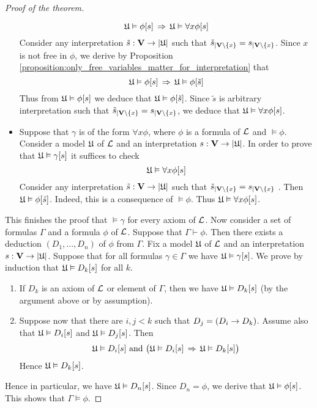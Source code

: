 \begin{proof}[Proof of the theorem]
\begin{itemize}
$${\mathfrak U} \vDash \phi[s] \,\Rightarrow\, {\mathfrak U} \vDash \forall x\phi[s]$$
Consider any interpretation $\tilde{s}:\mathbf{V} \rightarrow |{\mathfrak U}|$ such that $\tilde{s}_{\mid \mathbf{V}\setminus \{x\}} = s_{\mid \mathbf{V}\setminus \{x\}}$. Since $x$ is not free in $\phi$, we derive by Proposition \ref{proposition:only_free_variables_matter_for_interpretation} that
$${\mathfrak U} \vDash \phi[s] \,\Rightarrow\, {\mathfrak U} \vDash \phi[\tilde{s}]$$
Thus from ${\mathfrak U} \vDash \phi[s]$ we deduce that ${\mathfrak U} \vDash \phi[\tilde{s}]$. Since $\tilde{s}$ is arbitrary interpretation such that $\tilde{s}_{\mid \mathbf{V}\setminus \{x\}} = s_{\mid \mathbf{V}\setminus \{x\}}$, we deduce that ${\mathfrak U} \vDash \forall x\phi[s]$.
\item Suppose that $\gamma$ is of the form $\forall x\phi$, where $\phi$ is a formula of ${\mathcal L}$ and $\vDash \phi$. Consider a model ${\mathfrak U}$ of ${\mathcal L}$ and an interpretation $s:\mathbf{V} \rightarrow |{\mathfrak U}|$. In order to prove that ${\mathfrak U} \vDash \gamma[s]$ it suffices to check
$${\mathfrak U} \vDash \forall x\phi[s]$$
Consider any interpretation $\tilde{s}:\mathbf{V} \rightarrow |{\mathfrak U}|$ such that $\tilde{s}_{\mid \mathbf{V}\setminus \{x\}} = s_{\mid \mathbf{V}\setminus \{x\}}$ . Then ${\mathfrak U} \vDash \phi[\tilde{s}]$. Indeed, this is a consequence of $\vDash \phi$. Thus ${\mathfrak U} \vDash \forall  x\phi[s]$.
\end{itemize}
This finishes the proof that $\vDash \gamma$ for every axiom of ${\mathcal L}$. Now consider a set of formulas $\Gamma$ and a formula $\phi$ of ${\mathcal L}$. Suppose that $\Gamma \vdash \phi$. Then there exists a deduction $(D_1, ..., D_n)$ of $\phi$ from $\Gamma$. Fix a model ${\mathfrak U}$ of ${\mathcal L}$ and an interpretation $s:\mathbf{V} \rightarrow |{\mathfrak U}|$. Suppose that for all formulas $\gamma \in \Gamma$ we have ${\mathfrak U} \vDash \gamma[s]$. We prove by induction that ${\mathfrak U} \vDash D_k[s]$ for all $k$.
\begin{enumerate}[label=\textbf{(\arabic*)}, leftmargin=3.0em]
\item If $D_k$ is an axiom of ${\mathcal L}$ or element of $\Gamma$, then we have ${\mathfrak U} \vDash D_k[s]$ (by the argument above or
by assumption).
\item Suppose now that there are $i, j < k$ such that $D_j = (D_i \rightarrow D_k)$. Assume also that ${\mathfrak U} \vDash D_i[s]$ and ${\mathfrak U} \vDash D_j[s]$. Then
$${\mathfrak U} \vDash D_i[s]\mbox{ and }\big({\mathfrak U} \vDash D_i[s] \,\Rightarrow\, {\mathfrak U} \vDash D_k[s]\big)$$
Hence ${\mathfrak U} \vDash D_k[s]$.
\end{enumerate}
Hence in particular, we have ${\mathfrak U} \vDash D_n[s]$. Since $D_n = \phi$, we derive that ${\mathfrak U} \vDash \phi[s]$. This shows that $\Gamma \vDash \phi$.
\end{proof}

